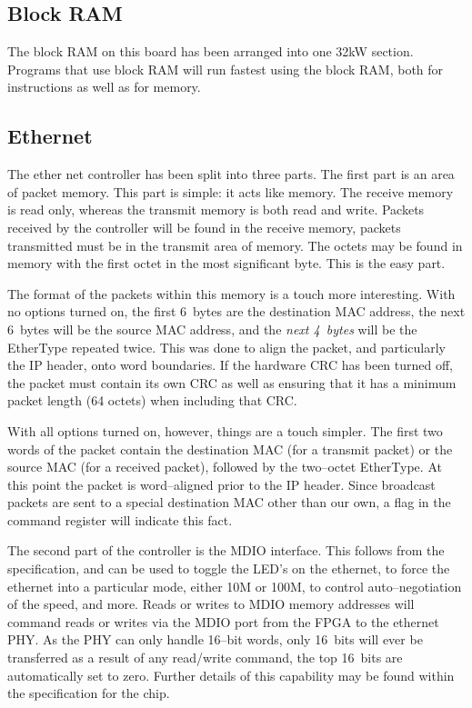\documentclass{gqtekspec}
\begin{document}
\subsection{Block RAM}

The block RAM on this board has been arranged into one 32kW section.
Programs that use block RAM will run fastest using the block RAM, both for
instructions as well as for memory.  

\subsection{Ethernet}

The ether net controller has been split into three parts.  The first part is
an area of packet memory.  This part is simple: it acts like memory.  The
receive memory is read only, whereas the transmit memory is both read and
write.  Packets received by the controller will be found in the receive memory,
packets transmitted must be in the transmit area of memory.  The octets
may be found in memory with the first octet in the most significant byte.
This is the easy part.

The format of the packets within this memory is a touch more interesting.
With no options turned on, the first 6~bytes are the destination MAC
address, the next 6~bytes will be the source MAC address, and the {\em next
4~bytes} will be the EtherType repeated twice.  This was done to align the
packet, and particularly the IP header, onto word boundaries.  If the hardware
CRC has been turned off, the packet must contain its own CRC as well as
ensuring that it has a minimum packet length (64 octets) when including that
CRC.

With all options turned on, however, things are a touch simpler.  The first
two words of the packet contain the destination MAC (for a transmit packet)
or the source MAC (for a received packet), followed by the two--octet
EtherType.  At this point the packet is word--aligned prior to the IP header.
Since broadcast packets are sent to a special destination MAC other than
our own, a flag in the command register will indicate this fact.


The second part of the controller is the MDIO interface.  This follows from
the specification, and can be used to toggle the LED's on the ethernet,
to force the ethernet into a particular mode, either 10M or 100M, to control
auto--negotiation of the speed, and more.  Reads or writes to MDIO memory
addresses will command reads or writes via the MDIO port from the FPGA to the
ethernet PHY.  As the PHY can only handle 16--bit words, only 16~bits will
ever be transferred as a result of any read/write command, the top 16~bits
are automatically set to zero.  Further details of this capability may be
found within the specification for the chip.
\end{document}
